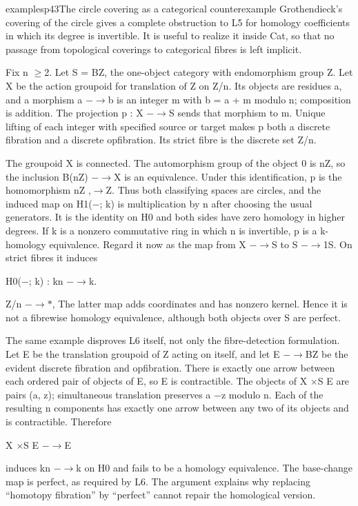 \begin{dcomment}{examples}{p43}{The circle covering as a categorical counterexample}
Grothendieck’s covering of the circle gives a complete obstruction to L5 for homology coefficients in which its degree is invertible. It is useful to realize it inside Cat, so that no passage from topological coverings to categorical fibres is left implicit.

Fix n \ensuremath{\geq}2. Let S = BZ, the one-object category with endomorphism group Z. Let X be the action groupoid for translation of Z on Z/n. Its objects are residues a, and a morphism a \ensuremath{-}\ensuremath{\to}b is an integer m with b = a + m modulo n; composition is addition. The projection p : X \ensuremath{-}\ensuremath{\to}S sends that morphism to m. Unique lifting of each integer with specified source or target makes p both a discrete fibration and a discrete opfibration. Its strict fibre is the discrete set Z/n.

The groupoid X is connected. The automorphism group of the object 0 is nZ, so the inclusion B(nZ) \ensuremath{-}\ensuremath{\to}X is an equivalence. Under this identification, p is the homomorphism nZ ,\ensuremath{\to}Z. Thus both classifying spaces are circles, and the induced map on H1(\ensuremath{-}; k) is multiplication by n after choosing the usual generators. It is the identity on H0 and both sides have zero homology in higher degrees. If k is a nonzero commutative ring in which n is invertible, p is a k-homology equivalence. Regard it now as the map from X \ensuremath{-}\ensuremath{\to}S to S \ensuremath{-}\ensuremath{\to}1S. On strict fibres it induces

H0(\ensuremath{-}; k) : kn \ensuremath{-}\ensuremath{\to}k.

Z/n \ensuremath{-}\ensuremath{\to}\ensuremath{*}, The latter map adds coordinates and has nonzero kernel. Hence it is not a fibrewise homology equivalence, although both objects over S are perfect.

The same example disproves L6 itself, not only the fibre-detection formulation. Let E be the translation groupoid of Z acting on itself, and let E \ensuremath{-}\ensuremath{\to}BZ be the evident discrete fibration and opfibration. There is exactly one arrow between each ordered pair of objects of E, so E is contractible. The objects of X \ensuremath{\times}S E are pairs (a, z); simultaneous translation preserves a \ensuremath{-}z modulo n. Each of the resulting n components has exactly one arrow between any two of its objects and is contractible. Therefore

X \ensuremath{\times}S E \ensuremath{-}\ensuremath{\to}E

induces kn \ensuremath{-}\ensuremath{\to}k on H0 and fails to be a homology equivalence. The base-change map is perfect, as required by L6. The argument explains why replacing “homotopy fibration” by “perfect” cannot repair the homological version.

\end{dcomment}

